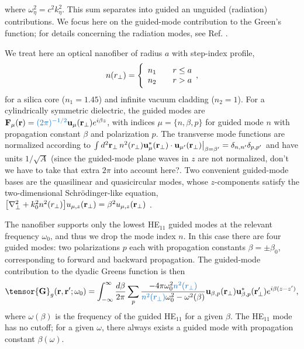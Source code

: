 \documentclass[preprint,aps,pra,onecolumn]{revtex4-1} %
\newcommand{\fidx}{\eta}
\newcommand{\change}[1]{{\color{RoyalBlue} #1}}
\newcommand{\comment}[1]{{\color{Maroon} #1}}
\begin{document}
where $\omega_\fidx^2 = c^2 k_\fidx^2$.  This sum separates into guided an unguided (radiation) contributions. We focus here on the guided-mode contribution to the Green's function; for details concerning the radiation modes, see Ref. \cite{sondergaard_general_2001,le_kien_spontaneous_2005, le_kien_anisotropy_2014} .

We treat here an optical nanofiber of radius $a$ with step-index profile,
	\begin{align}
		n(r_\perp) = \Bigg\{  
			\begin{array}{l l} n_1 & \quad r \leq a \\
						 n_2 & \quad r > a 
		\end{array},
	\end{align}
for a silica core ($n_1 = 1.45$) and infinite vacuum cladding ($n_2 = 1$).  For a cylindrically symmetric dielectric, the guided modes are $\mathbf{F}_\mu (\br) = \change{(2\pi)^{-1/2}} \mathbf{u}_\mu (\br_\perp) e^{i\beta z}$, with indices $\mu=\{n, \beta, p\}$ for guided mode $n$ with propagation constant $\beta$ and polarization $p$.  The transverse mode functions are normalized according to $\int d^2 \mathbf{r}_\perp \, n^2(r_\perp)\mathbf{u}^*_\mu (\mathbf{r}_\perp) \cdot \mathbf{u}_{\mu'} (\mathbf{r}_\perp)\big|_{\beta = \beta'} = \delta_{n,n'}\delta_{p,p'}$ and have units $1/\sqrt{A}$ \cite{le_kien_anisotropy_2014} \comment{(since the guided-mode plane waves in $z$ are not normalized, don't we have to take that extra $2\pi$ into account here?}.  Two convenient guided-mode bases are the quasilinear and quasicircular modes, whose $z$-components satisfy the two-dimensional Schr\"{o}dinger-like equation, $\big[\nabla_\perp^2 +k_0^2 n^2(r_\perp) \big] u_{\mu,z} (\mathbf{r}_\perp) = \beta^2 u_{\mu,z} (\mathbf{r}_\perp)$ \cite{kien_field_2004}.  

The nanofiber supports only the lowest HE$_{11}$ guided modes \cite{Yariv} at the relevant frequency $\omega_0$, and thus we drop the mode index $n$.  In this case there are four guided modes: two polarizations $p$ each with propagation constants $\beta = \pm \beta_0$, corresponding to forward and backward propagation.  The guided-mode contribution to the dyadic Greens function is then 
	\begin{equation} \label{Eq::GreensEigenmodes}
		\tensor{\mathbf{G}}_g(\br,\br'; \omega_0) = \int_{-\infty}^\infty \frac{d \beta}{2 \pi} \sum_{p} 
\frac{-4\pi\omega_0^2\change{n^2(r_\perp)}}{\change{n^2(r_\perp)}\omega_0^2-\omega^2(\beta)} \mathbf{u}_{\beta,p} (\br_\perp)\mathbf{u}^*_{\beta,p} 
(\br_{\perp}^\prime) e^{i\beta(z-z')},
	\end{equation}
where $ \omega(\beta)$ is the frequency of the guided HE$_{11}$ for a given $\beta$.  The 
HE$_{11}$ mode has no cutoff; for a given $\omega$, there always exists a guided mode with propagation 
constant $\beta(\omega)$.  
\end{document}
